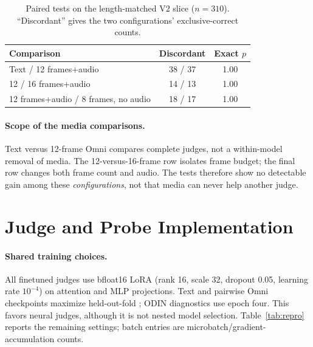 \begin{table}[t]
  \centering
  \caption{Paired tests on the length-matched V2 slice ($n=310$). ``Discordant'' gives the two configurations' exclusive-correct counts.}
  \label{tab:mcnemar}
  \begin{tabular}{lcc}
    \toprule
    Comparison & Discordant & Exact $p$ \\
    \midrule
    Text / 12 frames+audio & 38 / 37 & 1.00 \\
    12 / 16 frames+audio & 14 / 13 & 1.00 \\
    12 frames+audio / 8 frames, no audio & 18 / 17 & 1.00 \\
    \bottomrule
  \end{tabular}
\end{table}

\paragraph{Scope of the media comparisons.}
Text versus 12-frame Omni compares complete judges, not a within-model removal of media. The 12-versus-16-frame row isolates frame budget; the final row changes both frame count and audio. The tests therefore show no detectable gain among these \emph{configurations}, not that media can never help another judge.

\section{Judge and Probe Implementation}
\label{app:implementation}

\paragraph{Shared training choices.}
All finetuned judges use bfloat16 LoRA (rank 16, scale 32, dropout 0.05, learning rate $10^{-4}$) on attention and MLP projections. Text and pairwise Omni checkpoints maximize held-out-fold \waf; ODIN diagnostics use epoch four. This favors neural judges, although it is not nested model selection. Table~\ref{tab:repro} reports the remaining settings; batch entries are microbatch/gradient-accumulation counts.

